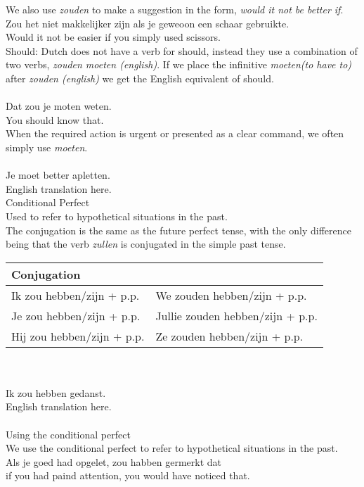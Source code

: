 \documentclass[letterpaper,11pt]{article}
\begin{document}
We also use \textit{zouden} to make a suggestion in the form, \textit{would it
not be better if}. \\
Zou het niet makkelijker zijn als je geweoon een schaar gebruikte. \\
Would it not be easier if you simply used scissors. \\
Should: Dutch does not have a verb for should, instead they use a combination of
two verbs, \textit{zouden moeten (english)}. If we place the infinitive
\textit{moeten(to have to)} after \textit{zouden (english)} we get the English
equivalent of should. \\
 \\
Dat zou je moten weten. \\
You should know that. \\
When the required action is urgent or presented as a clear command, we often
simply use \textit{moeten}. \\
 \\
Je moet better apletten. \\
English translation here. \\
Conditional Perfect \\
Used to refer to hypothetical situations in the past. \\
The conjugation is the same as the future perfect tense, with the only
difference being that the verb \textit{zullen} is conjugated in the simple past
tense. \\
\begin{tabular}[t]{l l}
    \textbf{Conjugation} \\
    \hline
    Ik zou hebben/zijn + p.p. & We zouden hebben/zijn + p.p. \\
    Je zou hebben/zijn + p.p. & Jullie zouden hebben/zijn + p.p. \\
    Hij zou hebben/zijn + p.p. & Ze zouden hebben/zijn + p.p. \\
\end{tabular}
\\
\\
Ik zou hebben gedanst. \\
English translation here. \\
\\
Using the conditional perfect \\
We use the conditional perfect to refer to hypothetical situations in the past.  \\
Als je goed had opgelet, zou habben germerkt dat \\
if you had paind attention, you would have noticed that. \\
\end{document}

